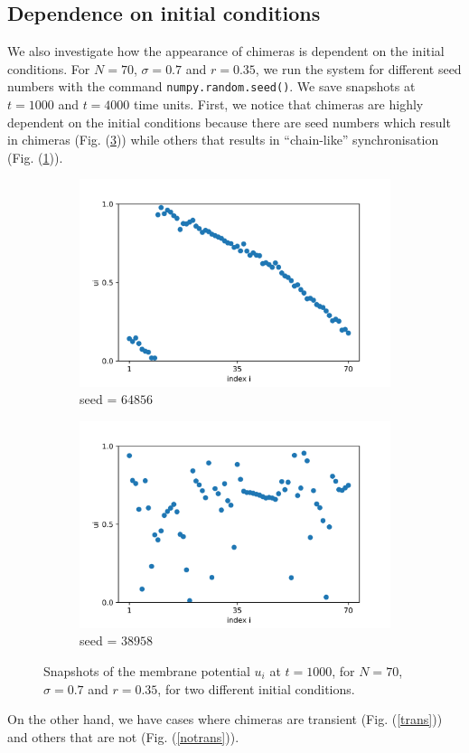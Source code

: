 \documentclass[a4paper,12pt]{article}
\begin{document}
\subsection{Dependence on initial conditions}
We also investigate how the appearance of chimeras is dependent on the initial conditions. For $N=70$, $\sigma=0.7$ and $r=0.35$, we run the system for different seed numbers with the command \texttt{numpy.random.seed()}. We save snapshots at $t=1000$ and $t=4000$ time units. First, we notice that chimeras are highly dependent on the initial conditions because there are seed numbers which result in chimeras (Fig. (\ref{chim})) while others that results in ``chain-like'' synchronisation (Fig. (\ref{chain})).
\begin{figure}[H]
\begin{subfigure}{0.49 \textwidth}
\centering
\includegraphics[width=\linewidth]{u_seed=64856_t=1000.png}
\caption{seed = $64856$}
\label{chain}
\end{subfigure}
\hfill
\begin{subfigure}{0.49 \textwidth}
\centering
\includegraphics[width=\linewidth]{u_seed=38958_t=1000.png}
\caption{seed = $38958$} 
\label{chim}
\end{subfigure}
\caption{Snapshots of the membrane potential $u_i$ at $t=1000$, for $N=70$, $\sigma=0.7$ and $r=0.35$, for two different initial conditions.}
\end{figure} 
\noindent On the other hand, we have cases where chimeras are transient (Fig. (\ref{trans})) and others that are not (Fig. (\ref{notrans})). 
\end{document}
